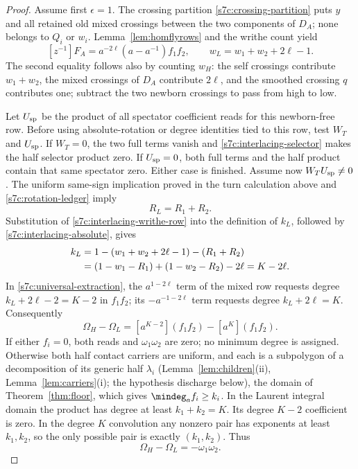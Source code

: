 \begin{proof}
Assume first $\epsilon=1$.  The crossing partition
\eqref{s7c:crossing-partition} puts $y$ and all retained old mixed
crossings between the two components of $D_A$; none belongs to $Q_i$
or $w_i$.  Lemma~\ref{lem:homflyrows} and the writhe count yield
\begin{equation}\label{s7c:interlacing-writhe-row}
 [z^{-1}]F_A=a^{-2\ell}(a-a^{-1})f_1f_2,
 \qquad w_L=w_1+w_2+2\ell-1.
\end{equation}
The second equality follows also by counting $w_H$: the self crossings
contribute $w_1+w_2$, the mixed crossings of $D_A$ contribute $2\ell$,
and the smoothed crossing $q$ contributes one; subtract the two newborn
crossings to pass from high to low.

Let $U_{\rm sp}$ be the product of all spectator coefficient reads for
this newborn-free row.  Before using absolute-rotation or degree identities
tied to this row, test $W_T$ and $U_{\rm sp}$.  If $W_T=0$, the two
full terms vanish and \eqref{s7c:interlacing-selector} makes the half
selector product zero.  If $U_{\rm sp}=0$, both full terms and the
half product contain that same spectator zero.  Either case is finished.
Assume now $W_TU_{\rm sp}\ne0$.  The uniform same-sign implication
proved in the turn calculation above and
\eqref{s7c:rotation-ledger} imply
\begin{equation}\label{s7c:interlacing-absolute}
 R_L=R_1+R_2.
\end{equation}
Substitution of \eqref{s7c:interlacing-writhe-row} into the definition
of $k_L$, followed by \eqref{s7c:interlacing-absolute}, gives
\begin{align}
 k_L&=1-(w_1+w_2+2\ell-1)-(R_1+R_2)\notag\\
    &=(1-w_1-R_1)+(1-w_2-R_2)-2\ell
      =K-2\ell.\label{s7c:interlacing-slot}
\end{align}
In \eqref{s7c:universal-extraction}, the $a^{1-2\ell}$ term of
the mixed row requests degree $k_L+2\ell-2=K-2$ in $f_1f_2$;
its $-a^{-1-2\ell}$ term requests degree $k_L+2\ell=K$.
Consequently
\begin{equation}\label{s7c:interlacing-extraction}
 \Omega_H-\Omega_L=[a^{K-2}](f_1f_2)-[a^K](f_1f_2).
\end{equation}
If either $f_i=0$, both reads and $\omega_1\omega_2$ are zero;
no minimum degree is assigned.  Otherwise both half contact carriers
are uniform, and each is a subpolygon of a decomposition of its generic
half $\lambda_i$ (Lemma~\ref{lem:children}(ii), Lemma~\ref{lem:carriers}(i);
the hypothesis discharge below), the domain of Theorem~\ref{thm:floor},
which gives $\mindeg_a f_i\ge k_i$.
In the Laurent integral domain the product has degree at least
$k_1+k_2=K$.  Its degree $K-2$ coefficient is zero.  In the degree
$K$ convolution any nonzero pair has exponents at least $k_1,k_2$,
so the only possible pair is exactly $(k_1,k_2)$.  Thus
\begin{equation}\label{s7c:interlacing-coefficient-result}
 \Omega_H-\Omega_L=-\omega_1\omega_2.
\end{equation}


\end{proof}
